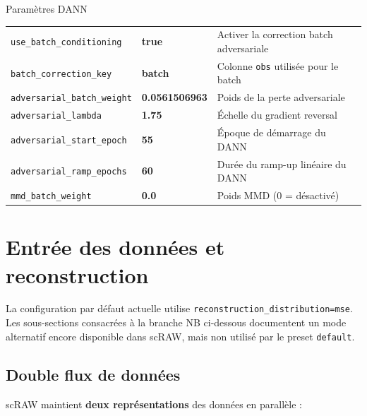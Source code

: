 \documentclass[11pt,a4paper]{article}
\begin{document}
\begin{parambox}{Param\`etres DANN}
\begin{tabular}{lll}
\texttt{use\_batch\_conditioning} & \textbf{true} & Activer la correction batch adversariale \\
\texttt{batch\_correction\_key} & \textbf{batch} & Colonne \texttt{obs} utilis\'ee pour le batch \\
\texttt{adversarial\_batch\_weight} & \textbf{0.0561506963} & Poids de la perte adversariale \\
\texttt{adversarial\_lambda} & \textbf{1.75} & \'Echelle du gradient reversal \\
\texttt{adversarial\_start\_epoch} & \textbf{55} & \'Epoque de d\'emarrage du DANN \\
\texttt{adversarial\_ramp\_epochs} & \textbf{60} & Dur\'ee du ramp-up lin\'eaire du DANN \\
\texttt{mmd\_batch\_weight} & \textbf{0.0} & Poids MMD (0 = d\'esactiv\'e) \\
\end{tabular}
\end{parambox}

\section{Entr\'ee des donn\'ees et reconstruction}
\label{sec:reconstruction}

\begin{importantbox}
La configuration par d\'efaut actuelle utilise \texttt{reconstruction\_distribution=mse}. Les sous-sections consacr\'ees \`a la branche NB ci-dessous documentent un mode alternatif encore disponible dans scRAW, mais non utilis\'e par le preset \texttt{default}.
\end{importantbox}

\subsection{Double flux de donn\'ees}

scRAW maintient \textbf{deux repr\'esentations} des donn\'ees en parall\`ele :
\end{document}
